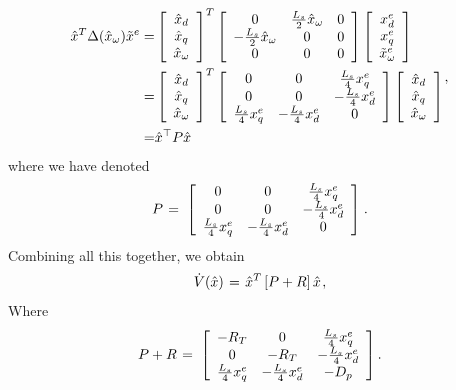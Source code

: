\documentclass[letterpaper, 10 pt, conference]{ieeeconf}
\newcommand{\m}      {{\hbox{\hskip 1pt}}}
\begin{document}
$$
\begin{aligned}
\hat{x}^{T}\Delta(\hat{x}_{\omega})\tilde{x}^{e}  = &\left[\begin{array}{c}
\hat{x}_{d}\\
\hat{x}_{q}\\
\hat{x}_{\omega}
\end{array}\right]^{T}\left[\begin{array}{ccc}
0 & \frac{L_{s}}{2}\hat{x}_{\omega} & 0\\
-\frac{L_{s}}{2}\hat{x}_{\omega} & 0 & 0\\
0 & 0 & 0
\end{array}\right]\left[\begin{array}{c}
x_{d}^{e}\\
x_{q}^{e}\\
\tilde{x}_{\omega}^{e}
\end{array}\right]\\
  =&  \left[\begin{array}{c}
\hat{x}_{d}\\
\hat{x}_{q}\\
\hat{x}_{\omega}
\end{array}\right]^{T}\left[\begin{array}{ccc}
0 & 0 & \frac{L_{s}}{4}x_{q}^{e}\\
0 & 0 & -\frac{L_{s}}{4}x_{d}^{e}\\
\frac{L_{s}}{4}x_{q}^{e} & -\frac{L_{s}}{4}x_{d}^{e} & 0
\end{array}\right]\left[\begin{array}{c}
\hat{x}_{d}\\
\hat{x}_{q}\\
\hat{x}_{\omega}
\end{array}\right]
\\= & \hat{x}^{\top}P\hat{x}
\end{aligned} \m,
$$
where we have denoted
$$ P \m=\m \left[\begin{array}{ccc} 0 & 0 & \frac{L_{s}}{4}
   x_{q}^{e}\\ 0 & 0 & -\frac{L_s}{4} x_d^e\\ \frac{L_s}{4} x_q^e 
   & -\frac{L_s}{4} x_d^e & 0 \end{array}\right] \m.$$
Combining all this together, we obtain 
$$\dot{V}(\hat{x}) \m=\m \hat{x}^{T}\left[P+R\right]\hat{x} \m,$$
Where 
$$ P+R \m=\m \left[\begin{array}{ccc} -R_T & 0 & \frac{L_s}{4}
   x_q^e\\ 0 & -R_T & -\frac{L_s}{4} x_d^e\\ \frac{L_s}{4} x_q^e 
   & -\frac{L_s}{4} x_d^e & -D_p \end{array}\right].$$
\end{document}

